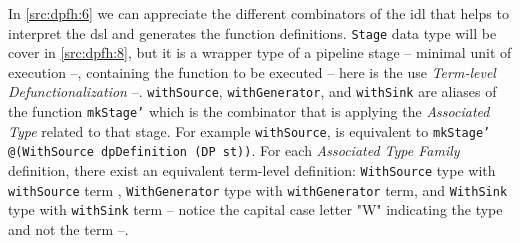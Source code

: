 In \autoref{src:dpfh:6} we can appreciate the different combinators of the \acrshort{idl} that helps to interpret the \acrshort{dsl} and generates the function definitions.
\texttt{Stage} data type will be cover in \autoref{src:dpfh:8}, but it is a wrapper type of a pipeline stage -- minimal unit of execution --, containing the function to be executed -- here is the use \emph{Term-level Defunctionalization} --.
\texttt{withSource}, \texttt{withGenerator}, and \texttt{withSink} are aliases of the function \texttt{mkStage'} which is the combinator that is applying the \emph{Associated Type} related to that stage. For example \texttt{withSource}, is equivalent to \texttt{mkStage' @(WithSource dpDefinition (DP st))}.
For each \emph{Associated Type Family} definition, there exist an equivalent term-level definition: \texttt{WithSource} type with \texttt{withSource} term , \texttt{WithGenerator} type with \texttt{withGenerator} term, and \texttt{WithSink} type with \texttt{withSink} term -- notice the capital case letter "W" indicating the type and not the term --.

